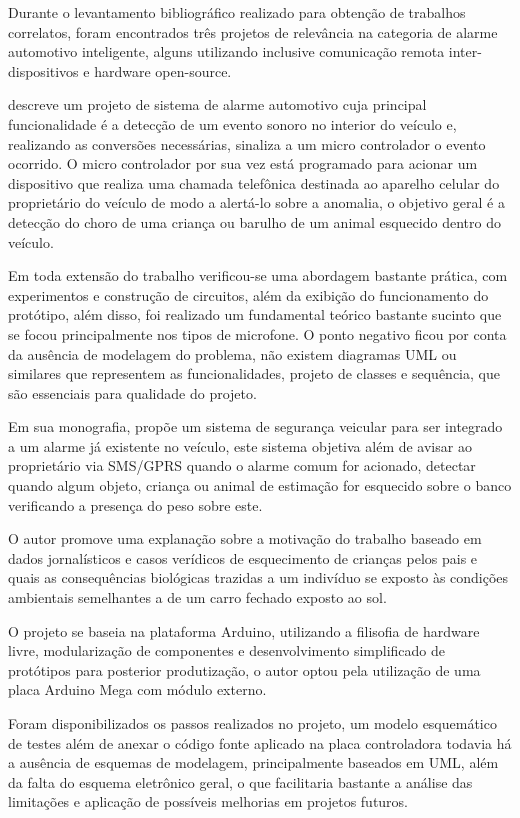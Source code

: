 Durante o levantamento bibliográfico realizado para obtenção de trabalhos correlatos, foram encontrados três projetos de relevância na categoria de alarme automotivo inteligente, alguns utilizando inclusive comunicação remota inter-dispositivos e hardware open-source.

\textcite{ivan:2007} descreve um projeto de sistema de alarme automotivo 
cuja principal funcionalidade é a detecção de um evento sonoro no interior do veículo e, realizando as conversões necessárias, sinaliza a um micro controlador o evento ocorrido. O micro controlador por sua vez está programado para acionar um dispositivo que realiza uma chamada telefônica destinada ao aparelho celular do proprietário do veículo de modo a alertá-lo sobre a anomalia, o objetivo geral é a detecção do choro de uma criança ou barulho de um animal esquecido dentro do veículo. 

Em toda extensão do trabalho verificou-se uma abordagem bastante prática, com 
experimentos e construção de circuitos, além da exibição do funcionamento do 
protótipo, além disso, foi realizado um fundamental teórico bastante sucinto 
que se focou principalmente nos tipos de microfone. O ponto negativo ficou 
por conta da ausência de modelagem do problema, não existem diagramas UML ou 
similares que representem as funcionalidades, projeto de classes e sequência, 
que são essenciais para qualidade do projeto.

Em sua monografia, \textcite{leandro:2010} propõe um sistema de segurança veicular para ser integrado a um alarme já existente no veículo, este sistema objetiva além de avisar ao proprietário via SMS/GPRS quando o alarme comum for acionado, detectar quando algum objeto, criança ou animal de estimação for esquecido sobre o banco verificando a presença do peso sobre este. 

O autor promove uma explanação sobre a motivação do trabalho baseado em dados jornalísticos e casos verídicos de esquecimento de crianças pelos pais e quais as consequências biológicas trazidas a um indivíduo se exposto às condições ambientais semelhantes a de um carro fechado exposto ao sol.

O projeto se baseia na plataforma Arduino, utilizando a filisofia de hardware 
livre, modularização de componentes e desenvolvimento simplificado de protótipos 
para posterior produtização, o autor optou pela utilização de uma placa Arduino 
Mega com módulo externo. 

Foram disponibilizados os passos realizados no projeto, um modelo esquemático de testes além de anexar o código fonte aplicado na placa controladora todavia há a ausência de esquemas de modelagem, principalmente baseados em UML, além da falta do esquema eletrônico geral, o que facilitaria bastante a análise das limitações e aplicação de possíveis melhorias em projetos futuros.

